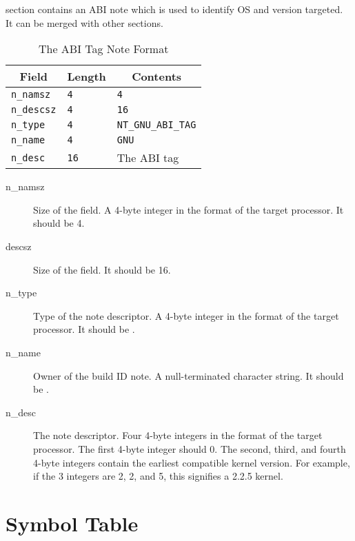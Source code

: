  section contains an ABI note which is used to
identify OS and version targeted.  It can be merged with other
 sections.

\begin{table}[H]
\Hrule
 \caption{The ABI Tag Note Format}
 \label{format-abi_tag}
 \begin{center}
  \begin{tabular}[t]{l|l|l}
   \multicolumn{1}{c}{Field}
     & \multicolumn{1}{c}{Length}
       & \multicolumn{1}{c}{Contents} \\
   \hline
   \texttt{n_namsz} & \texttt{4} & \texttt{4} \\
   \texttt{n_descsz} & \texttt{4} & \texttt{16} \\
   \texttt{n_type} & \texttt{4} & \texttt{NT_GNU_ABI_TAG} \\
   \texttt{n_name} & \texttt{4} & \texttt{GNU} \\
   \texttt{n_desc} & \texttt{16} & The ABI tag\\
  \end{tabular}
 \end{center}
\Hrule
\end{table}

\begin{description}
 \item[n_namsz] Size of the  field.  A 4-byte integer in the
   format of the target processor.  It should be 4.
 \item[descsz] Size of the  field.  It should be 16.
 \item[n_type] Type of the note descriptor.  A 4-byte integer in the format
   of the target processor.  It should be .
 \item[n_name] Owner of the build ID note.  A null-terminated character
   string.  It should be .
 \item[n_desc] The note descriptor. Four 4-byte integers in the format of
   the target processor.  The first 4-byte integer should 0.  The second,
   third, and fourth 4-byte integers contain the earliest compatible
   kernel version.  For example, if the 3 integers are 2, 2, and 5, this
   signifies a 2.2.5 kernel.
\end{description}

\section{Symbol Table}

